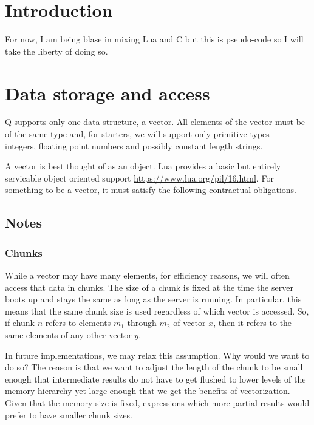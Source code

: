 \newcommand{\Assign}{\verb+:=+ }

\section{Introduction}

For now, I am being blase in mixing Lua and C but this is pseudo-code 
so I will take the liberty of doing so.

\TBC


\section{Data storage and access}

Q supports only one data structure, a vector. All elements of the vector must be
of the same type and, for starters, we will support only primitive types ---
integers, floating point numbers and possibly constant length strings.

A vector is best thought of as an object. Lua provides a basic but entirely
servicable object oriented support \url{https://www.lua.org/pil/16.html}. For
something to be a vector, it must satisfy the following contractual obligations.

\subsection{Notes}

\subsubsection{Chunks}
While a vector may have many elements, for efficiency reasons, 
we will often access that data in chunks. The size of a chunk is fixed at the
time the server boots up and stays the same as long as the server is running. In
particular, this means that the same chunk size is used regardless of which
vector is accessed. So, if chunk \(n\) refers to elements \(m_1\) through \( m_2\) of vector \(x\), then it refers to the same elements of any other vector \(y\). 

In future implementations, we may relax this assumption. Why would we want to do
so? The reason is that we want to adjust the length of the chunk to be small
enough that intermediate results do not have to get flushed to lower levels of
the memory hierarchy yet large enough that we get the benefits of vectorization.
Given that the memory size is fixed, expressions which more partial results
would prefer to have smaller chunk sizes.



